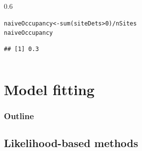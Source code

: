 \documentclass[color=usenames,dvipsnames]{beamer}\usepackage[]{graphicx}\usepackage[]{xcolor}
\makeatletter
\newcommand{\hlnum}[1]{\textcolor[rgb]{0.69,0.494,0}{#1}}%
\newcommand{\hlopt}[1]{\textcolor[rgb]{0,0,0}{#1}}%
\newcommand{\hldef}[1]{\textcolor[rgb]{0,0,0}{#1}}%
\newcommand{\hlkwb}[1]{\textcolor[rgb]{0,0.341,0.682}{#1}}%
\newcommand{\hlkwd}[1]{\textcolor[rgb]{0.004,0.004,0.506}{#1}}%
\newenvironment{kframe}{%
 \def\at@end@of@kframe{}%
 \ifinner\ifhmode%
  \def\at@end@of@kframe{\end{minipage}}%
  \begin{minipage}{\columnwidth}%
 \fi\fi%
 \def\FrameCommand##1{\hskip\@totalleftmargin \hskip-\fboxsep
 \colorbox{shadecolor}{##1}\hskip-\fboxsep
     \hskip-\linewidth \hskip-\@totalleftmargin \hskip\columnwidth}%
 \MakeFramed {\advance\hsize-\width
   \@totalleftmargin\z@ \linewidth\hsize
   \@setminipage}}%
 {\par\unskip\endMakeFramed%
 \at@end@of@kframe}
\newenvironment{knitrout}{}{} %
\makeatother
\begin{document}
\begin{frame}[fragile]
\begin{columns}
\begin{column}{0.6\textwidth}
\begin{knitrout}
\color{fgcolor}\begin{kframe}
\begin{alltt}
\hldef{naiveOccupancy} \hlkwb{<-} \hlkwd{sum}\hldef{(siteDets}\hlopt{>}\hlnum{0}\hldef{)}\hlopt{/}\hldef{nSites}
\hldef{naiveOccupancy}
\end{alltt}
\begin{verbatim}
## [1] 0.3
\end{verbatim}
\end{kframe}
\end{knitrout}
  \end{column}
  \end{columns}
\end{frame}



\section{Model fitting}



\begin{frame}
  \frametitle{Outline}
  \Large
  \tableofcontents[currentsection]
\end{frame}



\subsection{Likelihood-based methods}


\end{document}
